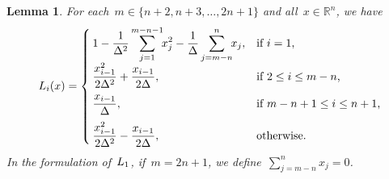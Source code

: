 \documentclass[draft]{article}
\numberwithin{equation}{section}
\theoremstyle{definition}
\theoremstyle{plain}
\newtheorem{lemma}{Lemma}[section]
\newcommand*{\lagp}[1][]{L\ifblank{#1}{}{_{#1}}}
\newcommand*{\R}{\mathbb{R}}
\newcommand*{\set}[2][]{#1\{#2#1\}}
\begin{document}
\begin{lemma}
    \label{lem:lagp}
    For each~$m \in \set{n + 2, n + 3, \dots,  2n + 1}$ and all~$x \in \R^n$, we have
    \begin{equation*}
        \lagp[i](x) =
        \begin{cases}
            \displaystyle 1 - \frac{1}{\Delta^2} \sum_{j = 1}^{m - n - 1} \!\! x_j^2 - \frac{1}{\Delta} \sum_{j = m - n}^n \!\! x_j,    & \text{if~$i = 1$,}\\[2ex]
            \displaystyle \frac{x_{i - 1}^2}{2\Delta^2} + \frac{x_{i - 1}}{2\Delta},                                                    & \text{if~$2 \le i \le m - n$,}\\[2ex]
            \displaystyle \frac{x_{i - 1}}{\Delta},                                                                                     & \text{if~$m - n + 1 \le i \le n + 1$,}\\[2ex]
            \displaystyle \frac{x_{i - 1}^2}{2\Delta^2} - \frac{x_{i - 1}}{2\Delta},                                                    & \text{otherwise.}
        \end{cases}
    \end{equation*}
    In the formulation of~$\lagp[1]$, if~$m = 2n + 1$, we define~$\sum_{j = m - n}^n x_j = 0$.
\end{lemma}
\end{document}
